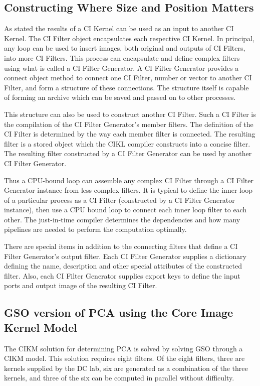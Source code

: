 \documentclass[11pt]{article}
\begin{document}
\subsection{Constructing Where Size and Position Matters}\label{cifiltergenerator}

As stated the results of a CI Kernel can be used as an input to another CI Kernel.  The CI Filter object encapsulates each respective CI Kernel.   In principal, any loop can be used to insert images, both original and outputs of CI Filters, into more CI Filters.   This process can  encapsulate and define complex filters using what is called a CI Filter Generator.  A CI Filter Generator provides a connect object method to connect one CI Filter, number or vector to another CI Filter, and form a structure of these connections.    The structure itself is capable of forming an archive which can be saved and passed on to other processes.      

This structure can also be used to construct another CI Filter.   Such a CI Filter is the compilation of the CI Filter Generator's member filters.   The definition of the CI Filter is determined by the way each member filter is connected. %
The resulting filter is a stored object which the CIKL compiler constructs into a concise filter.   The resulting filter constructed by a CI Filter Generator can be used by another CI Filter Generator.  

Thus a CPU-bound loop can assemble any complex CI Filter through a CI Filter Generator instance from less complex filters.  It is typical to define the inner loop of a particular process as a CI Filter (constructed by a CI Filter Generator instance), then use a CPU bound loop to connect each inner loop filter to each other.  The just-in-time compiler determines the dependencies and how many pipelines are needed to perform the computation optimally.  

There are special items in addition to the connecting filters that define a CI Filter Generator's output filter.  Each CI Filter Generator supplies a dictionary defining the name, description and other special attributes of the constructed filter.  Also, each CI Filter Generator supplies export keys to define the input ports and output image of the resulting CI Filter.  


\subsection{GSO version of PCA using the Core Image Kernel Model}
The CIKM solution for determining PCA is solved by solving GSO through a CIKM model.  This solution requires eight filters.  Of the eight filters, three are kernels supplied by the DC lab, six are generated as a combination of the three kernels, and three of the six can be computed in parallel without difficulty.  
\end{document}
